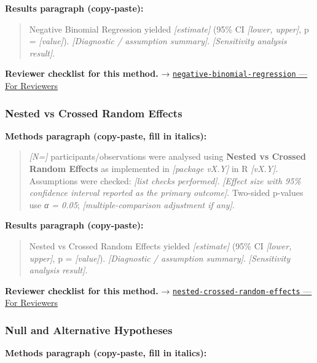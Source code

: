 \documentclass[
]{article}
\begin{document}
\textbf{Results paragraph (copy-paste):}

\begin{quote}
Negative Binomial Regression yielded \emph{{[}estimate{]}} (95\% CI
\emph{{[}lower, upper{]}}, p = \emph{{[}value{]}}). \emph{{[}Diagnostic
/ assumption summary{]}}. \emph{{[}Sensitivity analysis result{]}}.
\end{quote}

\textbf{Reviewer checklist for this method.} →
\href{../chapters/07-regression/negative-binomial-regression.Rmd\#for-reviewers}{\texttt{negative-binomial-regression}
--- For Reviewers}

\subsubsection{Nested vs Crossed Random
Effects}\label{nested-vs-crossed-random-effects}

\textbf{Methods paragraph (copy-paste, fill in italics):}

\begin{quote}
\emph{{[}N={]}} participants/observations were analysed using
\textbf{Nested vs Crossed Random Effects} as implemented in
\emph{{[}package vX.Y{]}} in R \emph{{[}vX.Y{]}}. Assumptions were
checked: \emph{{[}list checks performed{]}}. \emph{{[}Effect size with
95\% confidence interval reported as the primary outcome{]}}. Two-sided
p-values use \emph{α = 0.05}; \emph{{[}multiple-comparison adjustment if
any{]}}.
\end{quote}

\textbf{Results paragraph (copy-paste):}

\begin{quote}
Nested vs Crossed Random Effects yielded \emph{{[}estimate{]}} (95\% CI
\emph{{[}lower, upper{]}}, p = \emph{{[}value{]}}). \emph{{[}Diagnostic
/ assumption summary{]}}. \emph{{[}Sensitivity analysis result{]}}.
\end{quote}

\textbf{Reviewer checklist for this method.} →
\href{../chapters/07-regression/nested-crossed-random-effects.Rmd\#for-reviewers}{\texttt{nested-crossed-random-effects}
--- For Reviewers}

\subsubsection{Null and Alternative
Hypotheses}\label{null-and-alternative-hypotheses}

\textbf{Methods paragraph (copy-paste, fill in italics):}
\end{document}
